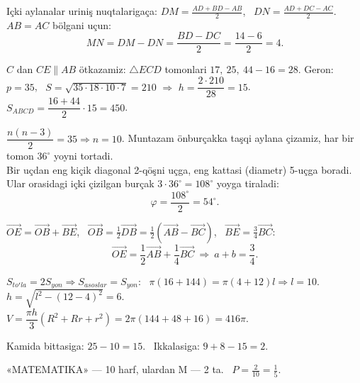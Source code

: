 Içki aylanalar uriniş nuqtalarigaça: $DM=\frac{AD+BD-AB}2$, \ $DN=\frac{AD+DC-AC}2$.\\
$AB=AC$ bölgani uçun:
\[MN=DM-DN=\frac{BD-DC}2=\frac{14-6}2=4.\]

$C$ dan $CE\parallel AB$ ötkazamiz: $\triangle ECD$ tomonlari $17,\ 25,\ 44-16=28$.
Geron: $p=35$, \ $S=\sqrt{35\cdot18\cdot10\cdot7}=210$ $\Rightarrow$ $h=\dfrac{2\cdot210}{28}=15$. \quad $S_{ABCD}=\dfrac{16+44}2\cdot15=450$.

$\dfrac{n(n-3)}2=35\Rightarrow n=10$. Muntazam önburçakka taşqi aylana çizamiz, har bir tomon $36^\circ$ yoyni tortadi.\\
Bir uçdan eng kiçik diagonal 2-qöşni uçga, eng kattasi (diametr) 5-uçga boradi. Ular orasidagi içki çizilgan burçak $3\cdot36^\circ=108^\circ$ yoyga tiraladi:
\[\varphi=\frac{108^\circ}2=54^\circ.\]

$\overrightarrow{OE}=\overrightarrow{OB}+\overrightarrow{BE}$, \ $\overrightarrow{OB}=\frac12\overrightarrow{DB}=\frac12\left(\overrightarrow{AB}-\overrightarrow{BC}\right)$, \ $\overrightarrow{BE}=\frac34\overrightarrow{BC}$:
\[\overrightarrow{OE}=\frac12\overrightarrow{AB}+\frac14\overrightarrow{BC}\ \Rightarrow\ a+b=\frac34.\]

$S_{toʻla}=2S_{yon}\Rightarrow S_{asoslar}=S_{yon}$: \ $\pi(16+144)=\pi(4+12)l\Rightarrow l=10$.\\
$h=\sqrt{l^2-(12-4)^2}=6$. \quad $V=\dfrac{\pi h}3(R^2+Rr+r^2)=2\pi(144+48+16)=416\pi$.

Kamida bittasiga: $25-10=15$. \ Ikkalasiga: $9+8-15=2$.

«MATEMATIKA» — 10 harf, ulardan M — 2 ta. \ $P=\frac2{10}=\frac15$.

